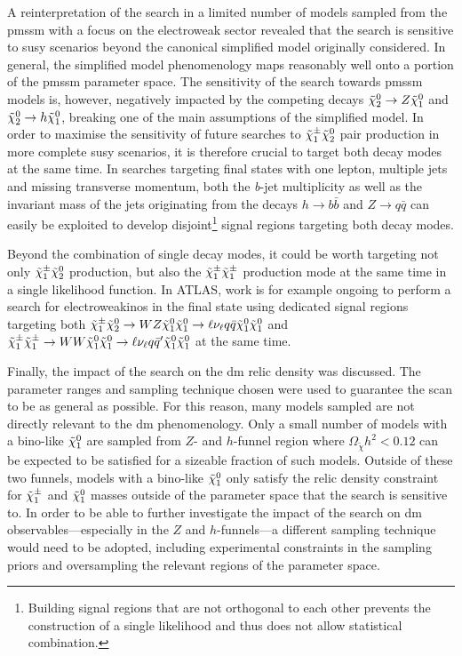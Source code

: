 A reinterpretation of the \onelepton search in a limited number of models sampled from the \gls{pmssm} with a focus on the electroweak sector revealed that the search is sensitive to \gls{susy} scenarios beyond the canonical simplified model originally considered.
In general, the simplified model phenomenology maps reasonably well onto a portion of the \gls{pmssm} parameter space. The sensitivity of the \onelepton search towards \gls{pmssm} models is, however, negatively impacted by the competing decays $\tilde{\chi}_2^0 \rightarrow Z \tilde{\chi}_1^0$ and $\tilde{\chi}_2^0 \rightarrow h \tilde{\chi}_1^0$, breaking one of the main assumptions of the simplified model.
In order to maximise the sensitivity of future searches to $\tilde{\chi}_1^\pm\tilde{\chi}_2^0$ pair production in more complete \gls{susy} scenarios, it is therefore crucial to target both decay modes at the same time.
In searches targeting final states with one lepton, multiple jets and missing transverse momentum, both the \textit{b}-jet multiplicity as well as the invariant mass of the jets originating from the decays $h\rightarrow b\bar{b}$ and $Z\rightarrow q\bar{q}$ can easily be exploited to develop disjoint\footnote{Building signal regions that are not orthogonal to each other prevents the construction of a single likelihood and thus does not allow statistical combination.} signal regions targeting both decay modes.

Beyond the combination of single decay modes, it could be worth targeting not only $\tilde{\chi}_1^\pm\tilde{\chi}_2^0$ production, but also the $\tilde{\chi}_1^\pm\tilde{\chi}_1^\pm$ production mode at the same time in a single likelihood function. In ATLAS, work is for example ongoing to perform a search for electroweakinos in the \onelepton final state using dedicated signal regions targeting both $\tilde{\chi}_1^\pm\tilde{\chi}_2^0 \rightarrow WZ\tilde{\chi}_1^0\tilde{\chi}_1^0\rightarrow \ell\nu_\ell q\bar{q} \tilde{\chi}_1^0\tilde{\chi}_1^0$ and $\tilde{\chi}_1^\pm\tilde{\chi}_1^\pm \rightarrow WW\tilde{\chi}_1^0\tilde{\chi}_1^0\rightarrow \ell\nu_\ell q\bar{q}' \tilde{\chi}_1^0\tilde{\chi}_1^0$ at the same time. 

Finally, the impact of the \onelepton search on the \gls{dm} relic density was discussed. The parameter ranges and sampling technique chosen were used to guarantee the scan to be as general as possible. For this reason, many models sampled are not directly relevant to the \gls{dm} phenomenology. Only a small number of models with a bino-like $\tilde{\chi}_1^0$ are sampled from $Z$- and $h$-funnel region where $\Omega_{\tilde{\chi}} h^2 < 0.12$ can be expected to be satisfied for a sizeable fraction of such models. Outside of these two funnels, models with a bino-like $\tilde{\chi}_1^0$ only satisfy the relic density constraint for $\tilde{\chi}_1^\pm$ and $\tilde{\chi}_1^0$ masses outside of the parameter space that the \onelepton search is sensitive to. In order to be able to further investigate the impact of the \onelepton search on \gls{dm} observables---especially in the $Z$ and $h$-funnels---a different sampling technique would need to be adopted, including experimental constraints in the sampling priors and oversampling the relevant regions of the parameter space. 



